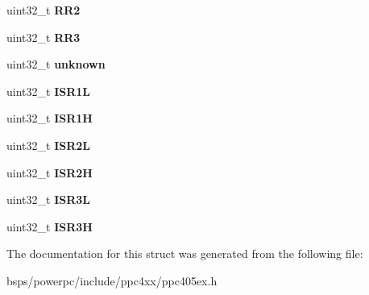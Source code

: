 \begin{DoxyCompactItemize}
uint32\+\_\+t {\bfseries R\+R2}
\item 
\mbox{\label{structGPIORegisters_a3589f2e7f155f8a280beedcc41c48568}} 
uint32\+\_\+t {\bfseries R\+R3}
\item 
\mbox{\label{structGPIORegisters_a59ca7c3a5252beccc947a732812812a2}} 
uint32\+\_\+t {\bfseries unknown}
\item 
\mbox{\label{structGPIORegisters_a512b3ff9392fe1ec14fba19dfb57a13a}} 
uint32\+\_\+t {\bfseries I\+S\+R1L}
\item 
\mbox{\label{structGPIORegisters_aee15b026f9695046f9c71dffd6e86f56}} 
uint32\+\_\+t {\bfseries I\+S\+R1H}
\item 
\mbox{\label{structGPIORegisters_ac74e33c1393cc65f8df34fdf73e042f7}} 
uint32\+\_\+t {\bfseries I\+S\+R2L}
\item 
\mbox{\label{structGPIORegisters_a3708e588fe284b2c28b59270b77f0be2}} 
uint32\+\_\+t {\bfseries I\+S\+R2H}
\item 
\mbox{\label{structGPIORegisters_ad28d5772e8790475915f6b8aeb6face7}} 
uint32\+\_\+t {\bfseries I\+S\+R3L}
\item 
\mbox{\label{structGPIORegisters_a2e5e7b1cf19f68251d92044582439253}} 
uint32\+\_\+t {\bfseries I\+S\+R3H}
\end{DoxyCompactItemize}


The documentation for this struct was generated from the following file\+:\begin{DoxyCompactItemize}
\item 
bsps/powerpc/include/ppc4xx/ppc405ex.\+h\end{DoxyCompactItemize}
